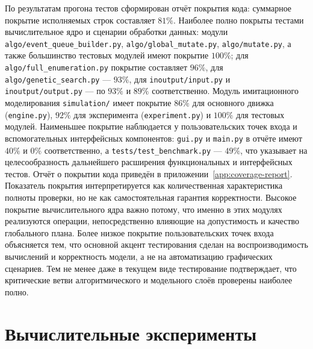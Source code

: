 По результатам прогона тестов сформирован отчёт покрытия кода: суммарное покрытие исполняемых строк составляет $81\%$.
Наиболее полно покрыты тестами вычислительное ядро и сценарии обработки данных: модули \texttt{algo/event\_queue\_builder.py}, \texttt{algo/global\_mutate.py}, \texttt{algo/mutate.py}, а также большинство тестовых модулей имеют покрытие $100\%$; для \texttt{algo/full\_enumeration.py} покрытие составляет $96\%$, для \texttt{algo/genetic\_search.py} --- $93\%$, для \texttt{inoutput/input.py} и \texttt{inoutput/output.py} --- по $93\%$ и $89\%$ соответственно. Модуль имитационного моделирования \texttt{simulation/} имеет покрытие $86\%$ для основного движка (\texttt{engine.py}), $92\%$ для эксперимента (\texttt{experiment.py}) и $100\%$ для тестовых модулей.
Наименьшее покрытие наблюдается у пользовательских точек входа и вспомогательных интерфейсных компонентов: \texttt{gui.py} и \texttt{main.py} в отчёте имеют $40\%$ и $0\%$ соответственно, а \texttt{tests/test\_benchmark.py} --- $49\%$, что указывает на целесообразность дальнейшего расширения функциональных и интерфейсных тестов.
Отчёт о покрытии кода приведён в приложении~\ref{app:coverage-report}.
Показатель покрытия интерпретируется как количественная характеристика полноты проверки, но не как самостоятельная гарантия корректности. Высокое покрытие вычислительного ядра важно потому, что именно в этих модулях реализуются операции, непосредственно влияющие на допустимость и качество глобального плана. Более низкое покрытие пользовательских точек входа объясняется тем, что основной акцент тестирования сделан на воспроизводимость вычислений и корректность модели, а не на автоматизацию графических сценариев. Тем не менее даже в текущем виде тестирование подтверждает, что критические ветви алгоритмического и модельного слоёв проверены наиболее полно.

\section{Вычислительные эксперименты}\label{sec:software/experiments}
 
